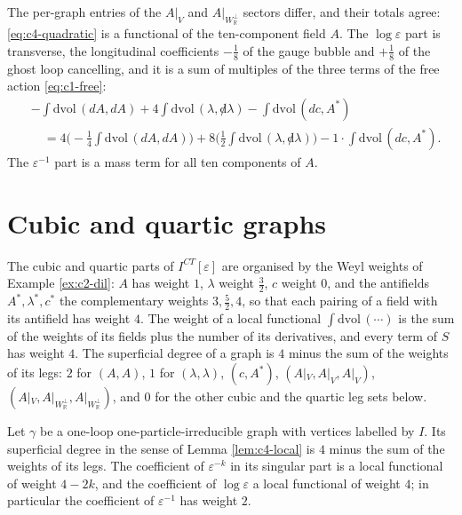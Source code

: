 \begin{remark}
\label{rem:c4-quadratic}
The per-graph entries of the $A|_V$ and $A|_{W_{\mathbb R}^\perp}$ sectors differ, and their totals agree: \eqref{eq:c4-quadratic} is a functional of the ten-component field $A$. The $\log\varepsilon$ part is transverse, the longitudinal coefficients $-\tfrac18$ of the gauge bubble and $+\tfrac18$ of the ghost loop cancelling, and it is a sum of multiples of the three terms of the free action \eqref{eq:c1-free}:
\[
\begin{aligned}
&-\int\mathrm{dvol}\,(dA,dA)+4\int\mathrm{dvol}\,(\lambda,{\not d}\lambda)-\int\mathrm{dvol}\,(dc,A^*)\\
&\quad=4\Big(-\tfrac14\int\mathrm{dvol}\,(dA,dA)\Big)+8\Big(\tfrac12\int\mathrm{dvol}\,(\lambda,{\not d}\lambda)\Big)-1\cdot\int\mathrm{dvol}\,(dc,A^*).
\end{aligned}
\]
The $\varepsilon^{-1}$ part is a mass term for all ten components of $A$.
\end{remark}

\section{Cubic and quartic graphs}

The cubic and quartic parts of $I^{CT}[\varepsilon]$ are organised by the Weyl weights of Example \ref{ex:c2-dil}: $A$ has weight $1$, $\lambda$ weight $\tfrac32$, $c$ weight $0$, and the antifields $A^*,\lambda^*,c^*$ the complementary weights $3,\tfrac52,4$, so that each pairing of a field with its antifield has weight $4$. The weight of a local functional $\int\mathrm{dvol}\,(\cdots)$ is the sum of the weights of its fields plus the number of its derivatives, and every term of $S$ has weight $4$. The superficial degree of a graph is $4$ minus the sum of the weights of its legs: $2$ for $(A,A)$, $1$ for $(\lambda,\lambda)$, $(c,A^*)$, $(A|_V,A|_V,A|_V)$, $(A|_V,A|_{W_{\mathbb R}^\perp},A|_{W_{\mathbb R}^\perp})$, and $0$ for the other cubic and the quartic leg sets below.

\begin{lemma}
\label{lem:c4-weights}
Let $\gamma$ be a one-loop one-particle-irreducible graph with vertices labelled by $I$. Its superficial degree in the sense of Lemma \ref{lem:c4-local} is $4$ minus the sum of the weights of its legs. The coefficient of $\varepsilon^{-k}$ in its singular part is a local functional of weight $4-2k$, and the coefficient of $\log\varepsilon$ a local functional of weight $4$; in particular the coefficient of $\varepsilon^{-1}$ has weight $2$.
\end{lemma}

